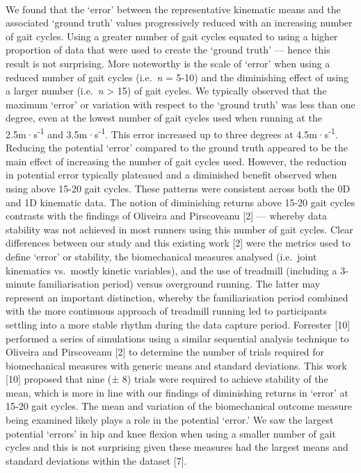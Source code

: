 \documentclass[]{elsarticle} %
\begin{document}
~

We found that the `error' between the representative kinematic means and
the associated `ground truth' values progressively reduced with an
increasing number of gait cycles. Using a greater number of gait cycles
equated to using a higher proportion of data that were used to create
the `ground truth' --- hence this result is not surprising. More
noteworthy is the scale of `error' when using a reduced number of gait
cycles (i.e.~\emph{n} = 5-10) and the diminishing effect of using a
larger number (i.e.~\emph{n} \textgreater{} 15) of gait cycles. We
typically observed that the maximum `error' or variation with respect to
the `ground truth' was less than one degree, even at the lowest number
of gait cycles used when running at the 2.5m·s\textsuperscript{-1} and
3.5m·s\textsuperscript{-1}. This error increased up to three degrees at
4.5m·s\textsuperscript{-1}. Reducing the potential `error' compared to
the ground truth appeared to be the main effect of increasing the number
of gait cycles used. However, the reduction in potential error typically
plateaued and a diminished benefit observed when using above 15-20 gait
cycles. These patterns were consistent across both the 0D and 1D
kinematic data. The notion of diminishing returns above 15-20 gait
cycles contrasts with the findings of Oliveira and Pirscoveanu {[}2{]}
--- whereby data stability was not achieved in most runners using this
number of gait cycles. Clear differences between our study and this
existing work {[}2{]} were the metrics used to define `error' or
stability, the biomechanical measures analysed (i.e.~joint kinematics
vs.~mostly kinetic variables), and the use of treadmill (including a
3-minute familiarisation period) versus overground running. The latter
may represent an important distinction, whereby the familiarisation
period combined with the more continuous approach of treadmill running
led to participants settling into a more stable rhythm during the data
capture period. Forrester {[}10{]} performed a series of simulations
using a similar sequential analysis technique to Oliveira and
Pirscoveanu {[}2{]} to determine the number of trials required for
biomechanical measures with generic means and standard deviations. This
work {[}10{]} proposed that nine (± 8) trials were required to achieve
stability of the mean, which is more in line with our findings of
diminishing returns in `error' at 15-20 gait cycles. The mean and
variation of the biomechanical outcome measure being examined likely
plays a role in the potential `error.' We saw the largest potential
`errors' in hip and knee flexion when using a smaller number of gait
cycles and this is not surprising given these measures had the largest
means and standard deviations within the dataset {[}7{]}.
\end{document}
